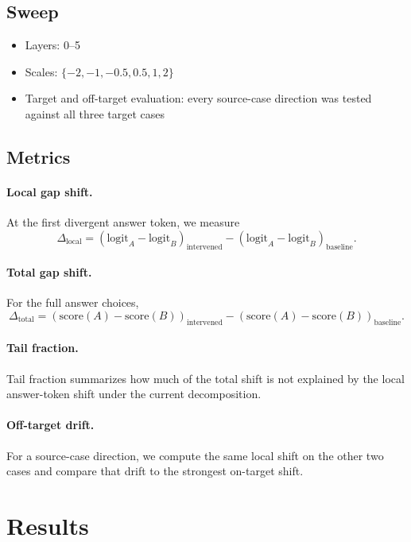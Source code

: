 \documentclass[11pt]{article}
\begin{document}
\subsection{Sweep}

\begin{itemize}[leftmargin=1.5em]
\item Layers: 0--5
\item Scales: $\{-2,-1,-0.5,0.5,1,2\}$
\item Target and off-target evaluation: every source-case direction was tested
against all three target cases
\end{itemize}

\subsection{Metrics}

\paragraph{Local gap shift.}
At the first divergent answer token, we measure
\[
\Delta_{\mathrm{local}} =
\left(\mathrm{logit}_A - \mathrm{logit}_B\right)_{\mathrm{intervened}} -
\left(\mathrm{logit}_A - \mathrm{logit}_B\right)_{\mathrm{baseline}}.
\]

\paragraph{Total gap shift.}
For the full answer choices,
\[
\Delta_{\mathrm{total}} =
\left(\mathrm{score}(A) - \mathrm{score}(B)\right)_{\mathrm{intervened}} -
\left(\mathrm{score}(A) - \mathrm{score}(B)\right)_{\mathrm{baseline}}.
\]

\paragraph{Tail fraction.}
Tail fraction summarizes how much of the total shift is not explained by the
local answer-token shift under the current decomposition.

\paragraph{Off-target drift.}
For a source-case direction, we compute the same local shift on the other two
cases and compare that drift to the strongest on-target shift.

\section{Results}
\end{document}
